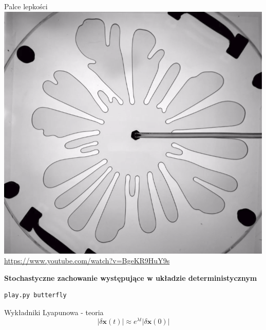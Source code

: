 \documentclass{beamer}
\begin{document}
\begin{frame}{Palce lepkości}
\centering
\includegraphics[height=0.6\textheight]{viscous_fingers}
\url{https://www.youtube.com/watch?v=BgeKR9HuY9s}

\end{frame}

\begin{frame}[fragile]
\textbf{Stochastyczne zachowanie występujące w układzie deterministycznym}
\begin{lstlisting}
play.py butterfly
\end{lstlisting}
\end{frame}

\begin{frame}[t]{Wykładniki Lyapunowa - teoria}
\begin{equation*}
| \delta\mathbf{x}(t) | \approx e^{\lambda t} | \delta \mathbf{x}(0) |
\end{equation*}
\end{frame}
\end{document}
